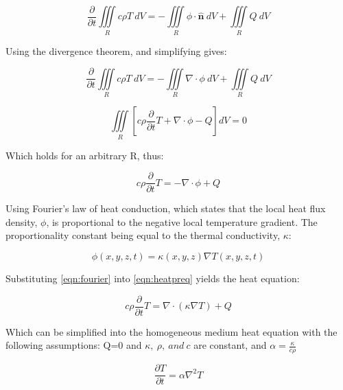 \begin{appendices}
\begin{equation}
\frac{\partial}{\partial t} \iiint\limits_{R} c\rho T\ dV = -\iiint \limits_{R} \phi\cdot \mathbf{\hat{n}}\ dV +  \iiint\limits_{R} Q\ dV
\end{equation}

Using the divergence theorem, and simplifying gives: 


\begin{equation}
\frac{\partial}{\partial t} \iiint\limits_{R} c\rho T\ dV = -\iiint \limits_{R} \nabla\cdot \phi\ dV +  \iiint\limits_{R} Q\ dV
\end{equation}

\begin{equation}
\iiint\limits_{R} \left[ c\rho \frac{\partial}{\partial t} T + \nabla\cdot \phi - Q\right] dV = 0
\end{equation}

Which holds for an arbitrary R, thus:

\begin{equation}
c\rho\frac{\partial}{\partial t}T = - \nabla \cdot \phi + Q
\label{eqn:heatpreq}
\end{equation}



Using Fourier's law of heat conduction, which states that the local heat flux density, $\phi$, is proportional to the negative local temperature gradient. The proportionality constant being equal to the thermal conductivity, $\kappa$:

\begin{equation}
\phi(x,y,z,t)=\kappa(x,y,z)\nabla T(x,y,z,t)
\label{eqn:fourier}
\end{equation}

Substituting \cref{eqn:fourier} into \cref{eqn:heatpreq} yields the heat equation:

\begin{equation}
c\rho\frac{\partial}{\partial t}T = \nabla\cdot (\kappa\nabla T) + Q
\end{equation}

Which can be simplified into the homogeneous medium heat equation with the following assumptions: Q=0 and $\kappa,\ \rho,\ and\ c$ are constant, and $\alpha=\tfrac{\kappa}{c\rho}$

\begin{equation}
\frac{\partial T}{\partial t} = \alpha \nabla^2 T
\end{equation}



\end{appendices}
